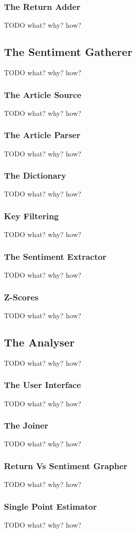 \subsubsection{The Return Adder}
TODO what? why? how?
\subsection{The Sentiment Gatherer}
TODO what? why? how?
\subsubsection{The Article Source}
TODO what? why? how?
\subsubsection{The Article Parser}
TODO what? why? how?
\subsubsection{The Dictionary}
TODO what? why? how?
\subsubsection{Key Filtering}
TODO what? why? how?
\subsubsection{The Sentiment Extractor}
TODO what? why? how?
\subsubsection{Z-Scores}
TODO what? why? how?
\subsection{The Analyser}
TODO what? why? how?
\subsubsection{The User Interface}
TODO what? why? how?
\subsubsection{The Joiner}
TODO what? why? how?
\subsubsection{Return Vs Sentiment Grapher}
TODO what? why? how?
\subsubsection{Single Point Estimator}
TODO what? why? how?
